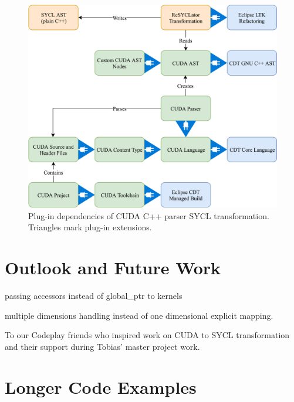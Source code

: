 \documentclass[sigconf]{acmart}
\newcommand{\inputcode}[2]{}
\newcommand{\tcode}[1]{\texttt{#1}}
\begin{document}
\begin{figure}[h]
  \label{fig:toolarch}
  \centering
  \includegraphics[width=\linewidth]{ResultSchemaSimple}
  \caption{Plug-in dependencies of CUDA C++ parser SYCL transformation. Triangles mark plug-in extensions.}
\end{figure}

\section{Outlook and Future Work}
passing accessors instead of global_ptr to kernels

multiple dimensions handling instead of one dimensional explicit mapping.



%
\begin{acks}
To our Codeplay friends who inspired work on CUDA to SYCL transformation and their support during Tobias' master project work.
\end{acks}

%



% 
\appendix

\section{Longer Code Examples}
\inputcode{cuda-main.cpp}{\tcode{main()} calling CUDA matrix multiplication kernel}
\end{document}

